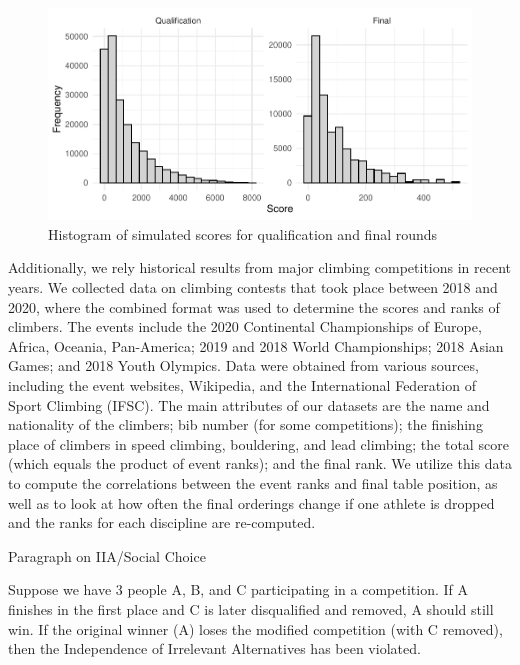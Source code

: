 \documentclass[12pt]{article}
\begin{document}
\begin{figure}

{\centering \includegraphics{draft_files/figure-latex/unnamed-chunk-5-1} 

}

\caption{Histogram of simulated scores for qualification and final rounds}\label{fig:unnamed-chunk-5}
\end{figure}

Additionally, we rely historical results from major climbing
competitions in recent years. We collected data on climbing contests
that took place between 2018 and 2020, where the combined format was
used to determine the scores and ranks of climbers. The events include
the 2020 Continental Championships of Europe, Africa, Oceania,
Pan-America; 2019 and 2018 World Championships; 2018 Asian Games; and
2018 Youth Olympics. Data were obtained from various sources, including
the event websites, Wikipedia, and the International Federation of Sport
Climbing (IFSC). The main attributes of our datasets are the name and
nationality of the climbers; bib number (for some competitions); the
finishing place of climbers in speed climbing, bouldering, and lead
climbing; the total score (which equals the product of event ranks); and
the final rank. We utilize this data to compute the correlations between
the event ranks and final table position, as well as to look at how
often the final orderings change if one athlete is dropped and the ranks
for each discipline are re-computed.

Paragraph on IIA/Social Choice

Suppose we have 3 people A, B, and C participating in a competition. If
A finishes in the first place and C is later disqualified and removed, A
should still win. If the original winner (A) loses the modified
competition (with C removed), then the Independence of Irrelevant
Alternatives has been violated.
\end{document}

